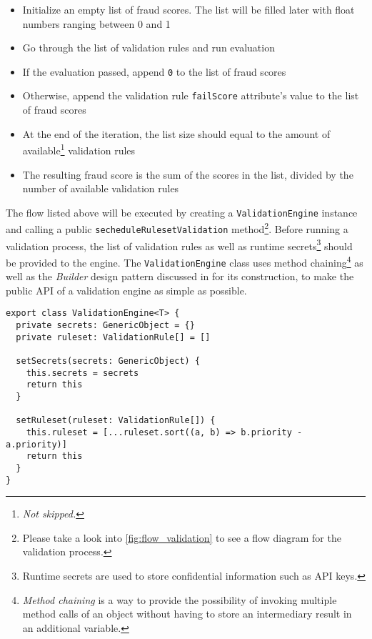       \begin{itemize}
        \item Initialize an empty list of fraud scores. The list will be filled later with float numbers ranging between 0 and 1
        \item Go through the list of validation rules and run evaluation
        \item If the evaluation passed, append \verb;0; to the list of fraud scores
        \item Otherwise, append the validation rule \verb;failScore; attribute's value to the list of fraud scores
        \item At the end of the iteration, the list size should equal to the amount of available\footnote{\emph{Not skipped.}} validation rules
        \item The resulting fraud score is the sum of the scores in the list, divided by the number of available validation rules
      \end{itemize}
      
      The flow listed above will be executed by creating a \verb;ValidationEngine; instance and calling a public \verb;secheduleRulesetValidation; method\footnote{Please take a look into \autoref{fig:flow_validation} to see a flow diagram for the validation process.}. Before running a validation process, the list of validation rules as well as runtime secrets\footnote{Runtime secrets are used to store confidential information such as API keys.} should be provided to the engine. The \verb;ValidationEngine; class uses method chaining\footnote{\emph{Method chaining} is a way to provide the possibility of invoking multiple method calls of an object without having to store an intermediary result in an additional variable.} as well as the \emph{Builder} design pattern discussed in \autocite[pp. 97-106]{gamma-1995} for its construction, to make the public API of a validation engine as simple as possible.

      \newpage
      \begin{lstlisting}[style=es6, caption={ValidationEngine class builder pattern using method chaining (TypeScript)}]
export class ValidationEngine<T> {
  private secrets: GenericObject = {}
  private ruleset: ValidationRule[] = []

  setSecrets(secrets: GenericObject) {
    this.secrets = secrets
    return this
  }

  setRuleset(ruleset: ValidationRule[]) {
    this.ruleset = [...ruleset.sort((a, b) => b.priority - a.priority)]
    return this
  }
}
\end{lstlisting}

